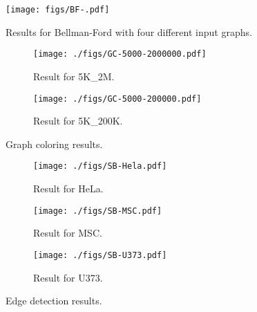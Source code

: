 \begin{figure*}[t]
\vspace{-0cm}
\centering
    \begin{minipage}{.3\textwidth}
    \centering
    \texttt{[image: figs/BF-.pdf]}
    \caption{Results for Bellman-Ford with four different input graphs.}
    \label{figs:bf}
    \end{minipage}\hspace{0.cm}
    \begin{minipage}{0.6\textwidth}
	\centering
    \begin{subfigure}{0.475\textwidth}
    	\centering
        \texttt{[image: ./figs/GC-5000-2000000.pdf]}
        \vspace{-20pt}\caption{Result for 5K\_2M.}
	\label{fig:gc_a}
    \end{subfigure}
	\quad
    \begin{subfigure}{0.475\textwidth}
    	\centering
        \texttt{[image: ./figs/GC-5000-200000.pdf]}
        \vspace{-20pt}\caption{Result for 5K\_200K.}
	\label{fig:gc_b}
    \end{subfigure}
	\vspace{-12pt}\caption{Graph coloring results.}
	\label{fig:gc}
    \end{minipage}
    \vspace{-4pt}
\end{figure*}
\begin{figure*}[t]
	\centering
    \begin{subfigure}{0.3\textwidth}
    	\centering
        \texttt{[image: ./figs/SB-Hela.pdf]}
        \vspace{-8pt}\caption{Result for HeLa.}
	\label{fig:sb_a}
    \end{subfigure}
	\quad
    \begin{subfigure}{0.3\textwidth}
    	\centering
        \texttt{[image: ./figs/SB-MSC.pdf]}
        \vspace{-8pt}\caption{Result for MSC.}
	\label{fig:sb_b}
    \end{subfigure}
	\quad
    \begin{subfigure}{0.3\textwidth}
    	\centering
        \texttt{[image: ./figs/SB-U373.pdf]}
        \vspace{-8pt}\caption{Result for U373.}
	\label{fig:sb_c}
    \end{subfigure}
    
	\vspace{-12pt}\caption{Edge detection results.}\vspace{-16pt}
	\label{fig:sb}
\end{figure*}

